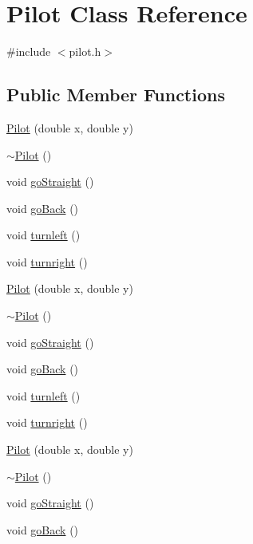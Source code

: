 \hypertarget{class_pilot}{}\section{Pilot Class Reference}
\label{class_pilot}


{\ttfamily \#include $<$pilot.\+h$>$}

\subsection*{Public Member Functions}
\begin{DoxyCompactItemize}
\item 
\hyperlink{class_pilot_ac6ff56d0c140449d7f75ef49b77814bc}{Pilot} (double x, double y)
\item 
\hyperlink{class_pilot_ad7255e8f07b88f856225d3ec89ff8f32}{$\sim$\+Pilot} ()
\item 
void \hyperlink{class_pilot_abad3861ed2473f5e4c334f038a642c55}{go\+Straight} ()
\item 
void \hyperlink{class_pilot_a59be9cbc9f05aeefe37caa4a57fb90aa}{go\+Back} ()
\item 
void \hyperlink{class_pilot_ac596f29cbed2c40dff28e3515e1410a6}{turnleft} ()
\item 
void \hyperlink{class_pilot_a10dd1174193c804401d1d3e1c6c5ddff}{turnright} ()
\item 
\hyperlink{class_pilot_ac6ff56d0c140449d7f75ef49b77814bc}{Pilot} (double x, double y)
\item 
\hyperlink{class_pilot_ad7255e8f07b88f856225d3ec89ff8f32}{$\sim$\+Pilot} ()
\item 
void \hyperlink{class_pilot_abad3861ed2473f5e4c334f038a642c55}{go\+Straight} ()
\item 
void \hyperlink{class_pilot_a59be9cbc9f05aeefe37caa4a57fb90aa}{go\+Back} ()
\item 
void \hyperlink{class_pilot_ac596f29cbed2c40dff28e3515e1410a6}{turnleft} ()
\item 
void \hyperlink{class_pilot_a10dd1174193c804401d1d3e1c6c5ddff}{turnright} ()
\item 
\hyperlink{class_pilot_ac6ff56d0c140449d7f75ef49b77814bc}{Pilot} (double x, double y)
\item 
\hyperlink{class_pilot_ad7255e8f07b88f856225d3ec89ff8f32}{$\sim$\+Pilot} ()
\item 
void \hyperlink{class_pilot_abad3861ed2473f5e4c334f038a642c55}{go\+Straight} ()
\item 
void \hyperlink{class_pilot_a59be9cbc9f05aeefe37caa4a57fb90aa}{go\+Back} ()

\end{DoxyCompactItemize}
